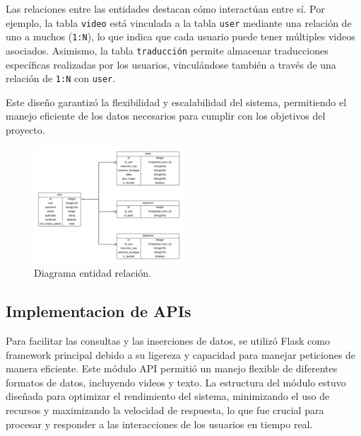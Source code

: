 Las relaciones entre las entidades destacan cómo interactúan entre sí. Por ejemplo, la tabla \texttt{video} está vinculada a la tabla \texttt{user} mediante una relación de uno a muchos (\texttt{1:N}), lo que indica que cada usuario puede tener múltiples videos asociados. Asimismo, la tabla \texttt{traducción} permite almacenar traducciones específicas realizadas por los usuarios, vinculándose también a través de una relación de \texttt{1:N} con \texttt{user}.

Este diseño garantizó la flexibilidad y escalabilidad del sistema, permitiendo el manejo eficiente de los datos necesarios para cumplir con los objetivos del proyecto.

\begin{figure}[H]
    \centering
    \includegraphics[width=0.5\textwidth]{figuras/entidad_relacion.png}
    \caption{Diagrama entidad relación.}
    \label{fig:entidad_relacion}
\end{figure}


\subsection{Implementacion de APIs}

Para facilitar las consultas y las inserciones de datos, se utilizó Flask como framework principal debido a su ligereza y capacidad para manejar peticiones de manera eficiente. Este módulo API permitió un manejo flexible de diferentes formatos de datos, incluyendo videos y texto. La estructura del módulo estuvo diseñada para optimizar el rendimiento del sistema, minimizando el uso de recursos y maximizando la velocidad de respuesta, lo que fue crucial para procesar y responder a las interacciones de los usuarios en tiempo real.


